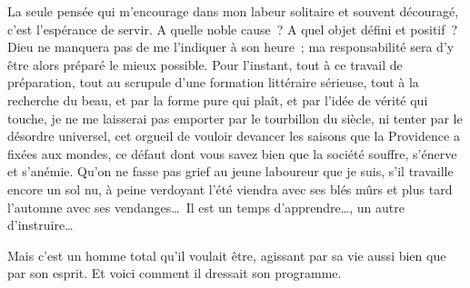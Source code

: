 \documentclass[french,twoside]{book} %
\newenvironment{quoteblock}%
  {\begin{quoting}}
  {\end{quoting}}
\newenvironment{quotebar}{%
    \def\FrameCommand{{\color{rubric!10!}\vrule width 0.5em} \hspace{0.9em}}%
    \def\OuterFrameSep{\itemsep} %
    \MakeFramed {\advance\hsize-\width \FrameRestore}
  }%
  {%
    \endMakeFramed
  }
\renewenvironment{quoteblock}%
  {%
    \savenotes
    \setstretch{0.9}
    \normalfont
    \begin{quotebar}
  }
  {%
    \end{quotebar}
    \spewnotes
  }
\begin{document}
\begin{quoteblock}
 \noindent La seule pensée qui m’encourage dans mon labeur solitaire et souvent découragé, c’est l’espérance de servir. A quelle noble cause ? A quel objet défini et positif ? Dieu ne manquera pas de me l’indiquer à son heure ; ma responsabilité sera d’y être alors préparé le mieux possible. Pour l’instant, tout à ce travail de préparation, tout au scrupule d’une formation littéraire sérieuse, tout à la recherche du beau, et par la forme pure qui plaît, et par l’idée de vérité qui touche, je ne me laisserai pas emporter par le tourbillon du siècle, ni tenter par le désordre universel, cet orgueil de vouloir devancer les saisons que la Providence a fixées aux mondes, ce défaut dont vous savez bien que la société souffre, s’énerve et s’anémie. Qu’on ne fasse pas grief au jeune laboureur que je suis, s’il travaille encore un sol nu, à peine verdoyant l’été viendra avec ses blés mûrs et plus tard l’automne avec ses vendanges… Il est un temps d’apprendre…, un autre d’instruire… ‌
 \end{quoteblock}

\noindent Mais c’est un homme total qu’il voulait être, agissant par sa vie aussi bien que par son esprit. Et voici comment il dressait son programme.‌\par
\end{document}
